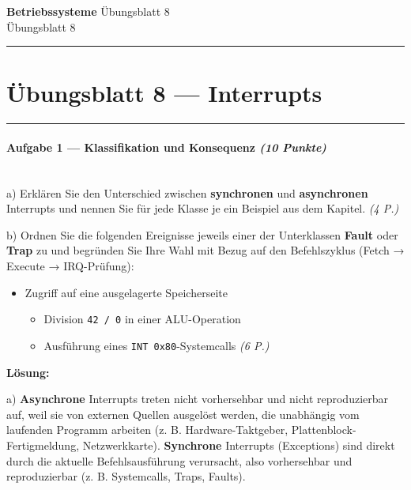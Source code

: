 \documentclass[11pt, a4paper]{article}
\providecommand{\nichttitle}{Übungsblatt}
\providecommand{\nichtsubtitle}{}
\renewcommand{\nichttitle}{Betriebssysteme}
\renewcommand{\nichtsubtitle}{Übungsblatt 8}
\begin{document}
\begin{center}
{\Large\bfseries\color{accent}\nichttitle}
\ifx\nichtsubtitle\empty\else
  \\[2pt]{\normalsize\color{accent!80!black}\nichtsubtitle}
\fi
\\[2pt]
\color{accent}\rule{0.4\linewidth}{0.8pt}\color{black}
\end{center}
\vspace{4pt}


\section{Übungsblatt 8 — Interrupts}


\noindent\textcolor{rulegray}{\rule{\linewidth}{0.4pt}}


\paragraph{Aufgabe 1 — Klassifikation und Konsequenz \textit{(10 Punkte)}}\mbox{}\\[2pt]

a) Erklären Sie den Unterschied zwischen \textbf{synchronen} und \textbf{asynchronen} Interrupts und nennen Sie für jede Klasse je ein Beispiel aus dem Kapitel. \textit{(4 P.)}


b) Ordnen Sie die folgenden Ereignisse jeweils einer der Unterklassen \textbf{Fault} oder \textbf{Trap} zu und begründen Sie Ihre Wahl mit Bezug auf den Befehlszyklus (Fetch → Execute → IRQ-Prüfung):

\begin{itemize}
  \item Zugriff auf eine ausgelagerte Speicherseite
\begin{itemize}
  \item Division \texttt{42 / 0} in einer ALU-Operation
  \item Ausführung eines \texttt{INT 0x80}-Systemcalls \textit{(6 P.)}
\end{itemize}
\end{itemize}

\textbf{Lösung:}


a) \textbf{Asynchrone} Interrupts treten nicht vorhersehbar und nicht reproduzierbar auf, weil sie von externen Quellen ausgelöst werden, die unabhängig vom laufenden Programm arbeiten (z. B. Hardware-Taktgeber, Plattenblock-Fertigmeldung, Netzwerkkarte). \textbf{Synchrone} Interrupts (Exceptions) sind direkt durch die aktuelle Befehlsausführung verursacht, also vorhersehbar und reproduzierbar (z. B. Systemcalls, Traps, Faults).
\end{document}
